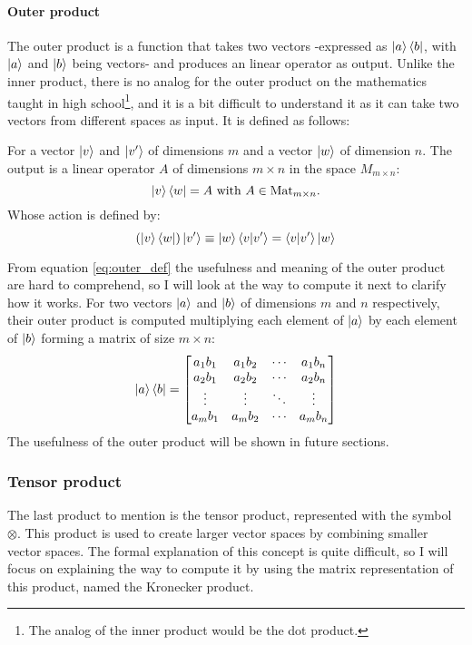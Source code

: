 \paragraph{Outer product}
The outer product is a function that takes two vectors -expressed as $\ket{a}\bra{b}$, with $\ket{a}$ and $\ket{b}$ being vectors- and produces an linear operator as output. Unlike the inner product, there is no analog for the outer product on the mathematics taught in high school\footnote{The analog of the inner product would be the dot product.}, and it is a bit difficult to understand it as it can take two vectors from different spaces as input. It is defined as follows:


For a vector $\ket{v}$ and $\ket{v'}$ of dimensions $m$ and a vector $\ket{w}$ of dimension $n$. The output is a linear operator $A$ of dimensions $m \times n$ in the space $M_{m\times n}$:
$$
\ket{v}\bra{w} = A \text{ with } A\in \mathrm{Mat}_{m\times n} .
$$ 
Whose action is defined by: 
\begin{equation}
	(\ket{v}\bra{w})\ket{v'} \equiv \ket{w}\bra{v}\ket{v'} = \bra{v}\ket{v'}\ket{w}
	\label{eq:outer_def}
\end{equation}


From equation \eqref{eq:outer_def} the usefulness and meaning of the outer product are hard to comprehend, so I will look at the way to compute it next to clarify how it works. For two vectors $\ket{a}$ and $\ket{b}$ of dimensions $m$ and $n$ respectively, their outer product is computed multiplying each element of $\ket{a}$ by each element of $\ket{b}$ forming a matrix of size $ m \times n$:
$$
\ket{a}\bra{b} = \begin{bmatrix}
	a_1 b_1 & a_1 b_2 & \cdots & a_1 b_n \\
	a_2 b_1 & a_2 b_2 & \cdots & a_2 b_n \\
	\vdots  & \vdots  & \ddots& \vdots  \\
	a_m b_1 & a_m b_2 & \cdots & a_m b_n \\
\end{bmatrix}
$$
The usefulness of the outer product will be shown in future sections.

\subsubsection{Tensor product}
The last product to mention is the tensor product, represented with the symbol $\otimes$. This product is used to create larger vector spaces by combining smaller vector spaces. The formal explanation of this concept is quite difficult, so I will focus on explaining the way to compute it by using the matrix representation of this product, named the Kronecker product. 

